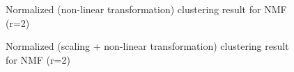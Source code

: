\documentclass[runningheads]{llncs}
\begin{document}
\begin{figure}
\centering
{}
\caption{Normalized (non-linear transformation) clustering result for NMF (r=2)} \label{Q8_NMF_nonlinear}
\end{figure}

\begin{figure}
\centering
{}
\caption{Normalized (scaling + non-linear transformation) clustering result for NMF (r=2)} \label{Q8_NMF_scale_nonlinear}
\end{figure}
\end{document}
